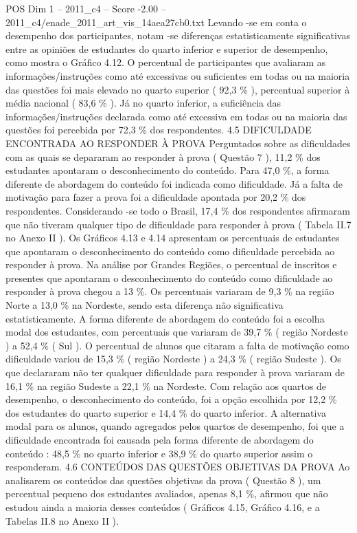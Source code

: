\begin{textsample}{POS Dim 1 – 2011\_c4 – Score -2.00 – 2011\_c4/enade\_2011\_art\_vis\_14aea27cb0.txt}
Levando -se em conta o desempenho dos participantes, notam -se diferenças estatisticamente significativas entre as opiniões de estudantes do quarto inferior e superior de desempenho, como mostra o Gráfico 4.12.
O percentual de participantes que avaliaram as informações/instruções como até excessivas ou suficientes em todas ou na maioria das questões foi mais elevado no quarto superior ( 92,3 \% ), percentual superior à média nacional ( 83,6 \% ).
Já no quarto inferior, a suficiência das informações/instruções declarada como até excessiva em todas ou na maioria das questões foi percebida por 72,3 \% dos respondentes. 4.5 DIFICULDADE ENCONTRADA AO RESPONDER À PROVA Perguntados sobre as dificuldades com as quais se depararam ao responder à prova ( Questão 7 ), 11,2 \% dos estudantes apontaram o desconhecimento do conteúdo.
Para 47,0 \%, a forma diferente de abordagem do conteúdo foi indicada como dificuldade.
Já a falta de motivação para fazer a prova foi a dificuldade apontada por 20,2 \% dos respondentes.
Considerando -se todo o Brasil, 17,4 \% dos respondentes afirmaram que não tiveram qualquer tipo de dificuldade para responder à prova ( Tabela II.7 no Anexo II ).
Os Gráficos 4.13 e 4.14 apresentam os percentuais de estudantes que apontaram o desconhecimento do conteúdo como dificuldade percebida ao responder à prova.
Na análise por Grandes Regiões, o percentual de inscritos e presentes que apontaram o desconhecimento do conteúdo como dificuldade ao responder à prova chegou a 13 \%.
Os percentuais variaram de 9,3 \% na região Norte a 13,0 \% na Nordeste, sendo esta diferença não significativa estatisticamente.
A forma diferente de abordagem do conteúdo foi a escolha modal dos estudantes, com percentuais que variaram de 39,7 \% ( região Nordeste ) a 52,4 \% ( Sul ).
O percentual de alunos que citaram a falta de motivação como dificuldade variou de 15,3 \% ( região Nordeste ) a 24,3 \% ( região Sudeste ).
Os que declararam não ter qualquer dificuldade para responder à prova variaram de 16,1 \% na região Sudeste a 22,1 \% na Nordeste.
Com relação aos quartos de desempenho, o desconhecimento do conteúdo, foi a opção escolhida por 12,2 \% dos estudantes do quarto superior e 14,4 \% do quarto inferior.
A alternativa modal para os alunos, quando agregados pelos quartos de desempenho, foi que a dificuldade encontrada foi causada pela forma diferente de abordagem do conteúdo : 48,5 \% no quarto inferior e 38,9 \% do quarto superior assim o responderam. 4.6 CONTEÚDOS DAS QUESTÕES OBJETIVAS DA PROVA Ao analisarem os conteúdos das questões objetivas da prova ( Questão 8 ), um percentual pequeno dos estudantes avaliados, apenas 8,1 \%, afirmou que não estudou ainda a maioria desses conteúdos ( Gráficos 4.15, Gráfico 4.16, e a Tabelas II.8 no Anexo II ).

\end{textsample}
